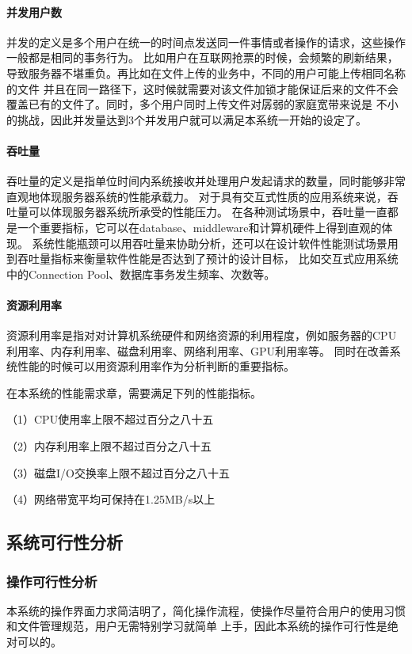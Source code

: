 \paragraph{并发用户数}
并发的定义是多个用户在统一的时间点发送同一件事情或者操作的请求，这些操作一般都是相同的事务行为。
比如用户在互联网抢票的时候，会频繁的刷新结果，导致服务器不堪重负。再比如在文件上传的业务中，不同的用户可能上传相同名称的文件
并且在同一路径下，这时候就需要对该文件加锁才能保证后来的文件不会覆盖已有的文件了。同时，多个用户同时上传文件对孱弱的家庭宽带来说是
不小的挑战，因此并发量达到3个并发用户就可以满足本系统一开始的设定了。
  
\paragraph{吞吐量}
吞吐量的定义是指单位时间内系统接收并处理用户发起请求的数量，同时能够非常直观地体现服务器系统的性能承载力。
对于具有交互式性质的应用系统来说，吞吐量可以体现服务器系统所承受的性能压力。
在各种测试场景中，吞吐量一直都是一个重要指标，它可以在database、middleware和计算机硬件上得到直观的体现。
系统性能瓶颈可以用吞吐量来协助分析，还可以在设计软件性能测试场景用到吞吐量指标来衡量软件性能是否达到了预计的设计目标，
比如交互式应用系统中的Connection Pool、数据库事务发生频率、次数等。

\paragraph{资源利用率}
资源利用率是指对对计算机系统硬件和网络资源的利用程度，例如服务器的CPU利用率、内存利用率、磁盘利用率、网络利用率、GPU利用率等。
同时在改善系统性能的时候可以用资源利用率作为分析判断的重要指标。

在本系统的性能需求章，需要满足下列的性能指标。
\par（1）CPU使用率上限不超过百分之八十五
\par（2）内存利用率上限不超过百分之八十五
\par（3）磁盘I/O交换率上限不超过百分之八十五
\par（4）网络带宽平均可保持在1.25MB/s以上

\subsection{系统可行性分析}

\subsubsection{操作可行性分析}本系统的操作界面力求简洁明了，简化操作流程，使操作尽量符合用户的使用习惯和文件管理规范，用户无需特别学习就简单
上手，因此本系统的操作可行性是绝对可以的。
